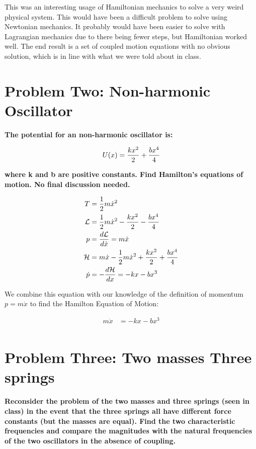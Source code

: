 \documentclass[10pt]{article} %
\begin{document}
This was an interesting usage of Hamiltonian mechanics to solve a very weird physical system. This would have been a difficult problem to solve using Newtonian mechanics. It probably would have been easier to solve with Lagrangian mechanics due to there being fewer steps, but Hamiltonian worked well. The end result is a set of coupled motion equations with no obvious solution, which is in line with what we were told about in class.

\section{Problem Two: Non-harmonic Oscillator}
\textbf{The potential for an non-harmonic oscillator is:}

\begin{equation*}
  U(x) = \frac{kx^2}{2} + \frac{bx^4}{4}\\
\end{equation*}

\textbf{where k and b are positive constants. Find Hamilton’s equations of motion. No final discussion needed.}

\begin{align*}
  T &= \frac{1}{2}m\dot{x}^2\\
  \mathcal{L} &= \frac{1}{2}m\dot{x}^2 - \frac{kx^2}{2} - \frac{bx^4}{4}\\
  \vspace{1cm}
  p &= \frac{d\mathcal{L}}{d\dot{x}} = m\dot{x}\\
  \mathcal{H} &= m\dot{x} - \frac{1}{2}m\dot{x}^2 + \frac{kx^2}{2} + \frac{bx^4}{4}\\
  \dot{p} &= -\frac{d\mathcal{H}}{dx} = -kx - bx^3\\
\end{align*}

We combine this equation with our knowledge of the definition of momentum $p = m\dot{x}$ to find the Hamilton Equation of Motion:

\begin{align*}
  m\ddot{x} &= -kx - bx^3\\
\end{align*}

\section{Problem Three: Two masses Three springs}
\textbf{Reconsider the problem of the two masses and three springs (seen in class) in the event that the three springs all have different force constants (but the masses are equal). Find the two characteristic frequencies and compare the magnitudes with the natural frequencies of the two oscillators in the absence of coupling.}
\end{document}
